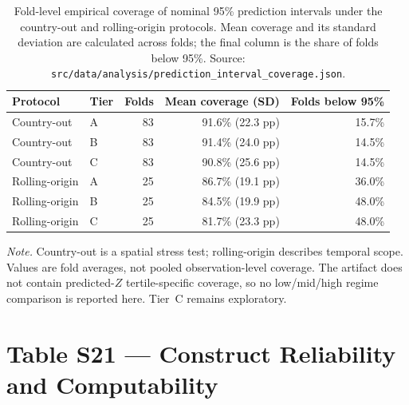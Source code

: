 \documentclass[11pt]{article}
\begin{document}
\setcounter{table}{19}%
\begin{table}[!htbp]
\centering
\small
\caption{Fold-level empirical coverage of nominal 95\% prediction intervals under the country-out and rolling-origin protocols. Mean coverage and its standard deviation are calculated across folds; the final column is the share of folds below 95\%. Source: \nolinkurl{src/data/analysis/prediction_interval_coverage.json}.}
\label{tab:interval-coverage-protocol}
\begin{tabular}{@{}llrrr@{}}
\toprule
\textbf{Protocol} & \textbf{Tier} & \textbf{Folds} & \textbf{Mean coverage (SD)} & \textbf{Folds below 95\%}\\
\midrule
Country-out & A & 83 & 91.6\% (22.3 pp) & 15.7\% \\
Country-out & B & 83 & 91.4\% (24.0 pp) & 14.5\% \\
Country-out & C & 83 & 90.8\% (25.6 pp) & 14.5\% \\
Rolling-origin & A & 25 & 86.7\% (19.1 pp) & 36.0\% \\
Rolling-origin & B & 25 & 84.5\% (19.9 pp) & 48.0\% \\
Rolling-origin & C & 25 & 81.7\% (23.3 pp) & 48.0\% \\
\bottomrule
\end{tabular}

\vspace{4pt}
\justifying\small
\textit{Note.} Country-out is a spatial stress test; rolling-origin describes temporal scope. Values are fold averages, not pooled observation-level coverage. The artifact does not contain predicted-$Z$ tertile-specific coverage, so no low/mid/high regime comparison is reported here. Tier~C remains exploratory.
\end{table}

\section*{Table S21 --- Construct Reliability and Computability}
\label{sec:table_s21}
\end{document}

